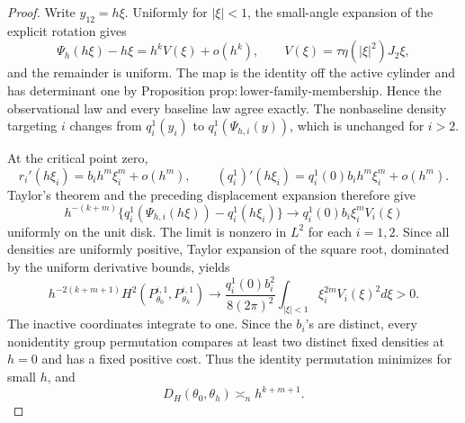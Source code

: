 \documentclass{article}
\begin{document}
\begin{proof}
Write \(y_{12}=h\xi\). Uniformly for \(|\xi|<1\), the small-angle expansion of the explicit rotation gives
\[
\Psi_h(h\xi)-h\xi
=h^kV(\xi)+o(h^k),
\qquad
V(\xi)=\tau\eta(|\xi|^2)J_2\xi,
\]
and the remainder is uniform. The map is the identity off the active cylinder and has determinant one by Proposition \(\mathrm{prop:lower\text{-}family\text{-}membership}\). Hence the observational law and every baseline law agree exactly. The nonbaseline density targeting \(i\) changes from \(q_i^1(y_i)\) to \(q_i^1(\Psi_{h,i}(y))\), which is unchanged for \(i>2\).

At the critical point zero,
\[
r_i'(h\xi_i)=b_i h^m\xi_i^m+o(h^m),
\qquad
(q_i^1)'(h\xi_i)=q_i^1(0)b_i h^m\xi_i^m+o(h^m).
\]
Taylor's theorem and the preceding displacement expansion therefore give
\[
h^{-(k+m)}\{q_i^1(\Psi_{h,i}(h\xi))-q_i^1(h\xi_i)\}
\longrightarrow q_i^1(0)b_i\xi_i^mV_i(\xi)
\]
uniformly on the unit disk. The limit is nonzero in \(L^2\) for each \(i=1,2\). Since all densities are uniformly positive, Taylor expansion of the square root, dominated by the uniform derivative bounds, yields
\[
h^{-2(k+m+1)}H^2(P_{\theta_0}^{i,1},P_{\theta_h}^{i,1})
\longrightarrow
\frac{q_i^1(0)b_i^2}{8(2\pi)^2}
\int_{|\xi|<1}\xi_i^{2m}V_i(\xi)^2d\xi>0.
\]
The inactive coordinates integrate to one. Since the \(b_i\)'s are distinct, every nonidentity group permutation compares at least two distinct fixed densities at \(h=0\) and has a fixed positive cost. Thus the identity permutation minimizes for small \(h\), and
\[
D_H(\theta_0,\theta_h)\asymp_n h^{k+m+1}.
\]


\end{proof}
\end{document}
